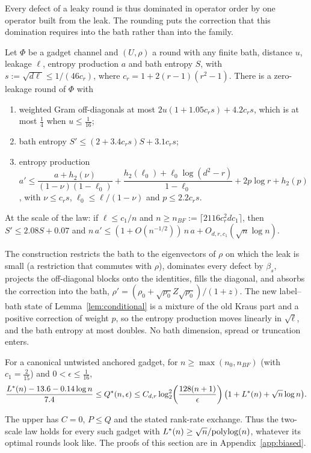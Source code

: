 Every defect of a leaky round is thus dominated in operator order by one operator built from the leak. The rounding puts the correction that this
domination requires into the bath rather than into the family.

\begin{theorem}\label{thm:BF}
Let $\Phi$ be a gadget channel and $(U,\rho)$ a round with any finite bath, distance $u$, leakage $\ell$, entropy production $a$ and bath entropy $S$,
with $s:=\sqrt{d\ell}\le1/(46c_r)$, where $c_r=1+2(r-1)(r^2-1)$. There is a zero-leakage round of $\Phi$ with
\begin{enumerate}[label=(\arabic*),itemsep=1pt]
\item weighted Gram off-diagonals at most $2u(1+1.05c_rs)+4.2c_rs$, which is at most $\frac14$ when $u\le\frac1{16}$;
\item bath entropy $S'\le(2+3.4c_rs)S+3.1c_rs$;
\item entropy production $a'\le\dfrac{a+h_2(\nu)}{(1-\nu)(1-\ell_0)}+\dfrac{h_2(\ell_0)+\ell_0\log(d^2-r)}{1-\ell_0}+2p\log r+h_2(p)$, with $\nu\le c_rs$,
$\ell_0\le\ell/(1-\nu)$ and $p\le2.2c_rs$.
\end{enumerate}
At the scale of the law: if $\ell\le c_1/n$ and $n\ge n_{BF}:=\lceil2116c_r^2dc_1\rceil$, then $S'\le2.08S+0.07$ and
$n\,a'\le(1+O(n^{-1/2}))\,n\,a+O_{d,r,c_1}(\sqrt n\log n)$.
\end{theorem}

The construction restricts the bath to the eigenvectors of $\rho$ on which the leak is small (a restriction that commutes with $\rho$), dominates
every defect by $\beta_s$, projects the off-diagonal blocks onto the identities, fills the diagonal, and absorbs the correction into the bath,
$\rho'=(\rho_0+\sqrt{\rho_0}Z\sqrt{\rho_0})/(1+z)$. The new label--bath state of Lemma~\ref{lem:conditional} is a mixture of the old Kraus part and a
positive correction of weight $p$, so the entropy production moves linearly in $\sqrt\ell$, and the bath entropy at most doubles. No bath dimension,
spread or truncation enters.

\begin{corollary}\label{cor:BF}
For a canonical untwisted anchored gadget, for $n\ge\max(n_0,n_{BF})$ (with
$c_1=\frac2{15}$) and $0<\epsilon\le\frac1{16}$,
\[
\frac{L^{*}(n)-13.6-0.14\log n}{7.4}\le Q^{*}(n,\epsilon)\le C_{d,r}\log_2^2\!\left(\frac{128(n+1)}\epsilon\right)\bigl(1+L^{*}(n)+\sqrt n\log n\bigr).
\]
\end{corollary}

The upper has $C=0$, $P\le Q$ and the stated rank-rate exchange. Thus the two-scale law holds for every such gadget with $L^{*}(n)\ge\sqrt n/\mathrm{polylog}(n)$,
whatever its optimal rounds look like. The proofs of this section are in Appendix~\ref{app:biased}.
